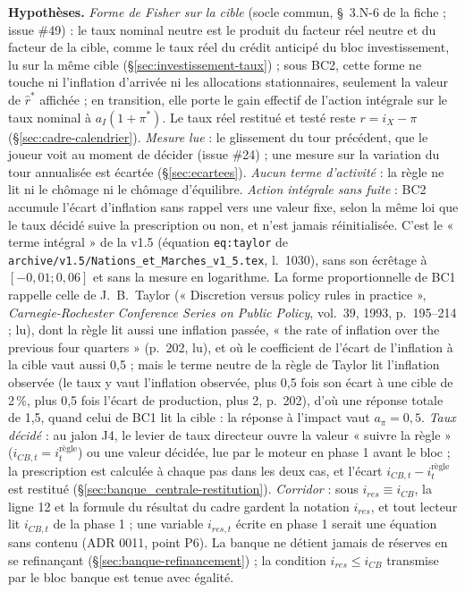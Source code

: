 \documentclass[11pt,a4paper]{article}
\newcommand{\hyp}{\par\noindent\textbf{Hypothèses.} }
\begin{document}
\begin{proposee}
\begin{lecture}
\hyp \emph{Forme de Fisher sur la cible} (socle commun, \S~3.N-6 de la fiche ; issue \#49) : le taux nominal neutre est le produit du facteur réel neutre et du facteur de la cible, comme le taux réel du crédit anticipé du bloc investissement, lu sur la même cible (\S\ref{sec:investissement-taux}) ; sous BC2, cette forme ne touche ni l'inflation d'arrivée ni les allocations stationnaires, seulement la valeur de $\hat r^\ast$ affichée ; en transition, elle porte le gain effectif de l'action intégrale sur le taux nominal à $a_I(1 + \pi^\ast)$. Le taux réel restitué et testé reste $r = i_X - \pi$ (\S\ref{sec:cadre-calendrier}). \emph{Mesure lue} : le glissement du tour précédent, que le joueur voit au moment de décider (issue \#24) ; une mesure sur la variation du tour annualisée est écartée (\S\ref{sec:ecartees}). \emph{Aucun terme d'activité} : la règle ne lit ni le chômage ni le chômage d'équilibre. \emph{Action intégrale sans fuite} : BC2 accumule l'écart d'inflation sans rappel vers une valeur fixe, selon la même loi que le taux décidé suive la prescription ou non, et n'est jamais réinitialisée. C'est le « terme intégral » de la v1.5 (équation \texttt{eq:taylor} de \nolinkurl{archive/v1.5/Nations_et_Marches_v1_5.tex}, l.~1030), sans son écrêtage à $[-0{,}01 ; 0{,}06]$ et sans la mesure en logarithme. La forme proportionnelle de BC1 rappelle celle de J.~B.~Taylor (« Discretion versus policy rules in practice », \emph{Carnegie-Rochester Conference Series on Public Policy}, vol.~39, 1993, p.~195--214 ; lu), dont la règle lit aussi une inflation passée, « the rate of inflation over the previous four quarters » (p.~202, lu), et où le coefficient de l'écart de l'inflation à la cible vaut aussi 0,5 ; mais le terme neutre de la règle de Taylor lit l'inflation observée (le taux y vaut l'inflation observée, plus 0,5 fois son écart à une cible de 2\,\%, plus 0,5 fois l'écart de production, plus 2, p.~202), d'où une réponse totale de 1,5, quand celui de BC1 lit la cible : la réponse à l'impact vaut $a_\pi = 0{,}5$. \emph{Taux décidé} : au jalon J4, le levier de taux directeur ouvre la valeur « suivre la règle » ($i_{\mathit{CB},t} = i^{\text{règle}}_t$) ou une valeur décidée, lue par le moteur en phase 1 avant le bloc ; la prescription est calculée à chaque pas dans les deux cas, et l'écart $i_{\mathit{CB},t} - i^{\text{règle}}_t$ est restitué (\S\ref{sec:banque_centrale-restitution}). \emph{Corridor} : sous $i_{\mathit{res}} \equiv i_{\mathit{CB}}$, la ligne 12 et la formule du résultat du cadre gardent la notation $i_{\mathit{res}}$, et tout lecteur lit $i_{\mathit{CB},t}$ de la phase 1 ; une variable $i_{\mathit{res},t}$ écrite en phase 1 serait une équation sans contenu (ADR 0011, point P6). La banque ne détient jamais de réserves en se refinançant (\S\ref{sec:banque-refinancement}) ; la condition $i_{\mathit{res}} \le i_{\mathit{CB}}$ transmise par le bloc banque est tenue avec égalité.

\end{lecture}
\end{proposee}
\end{document}
